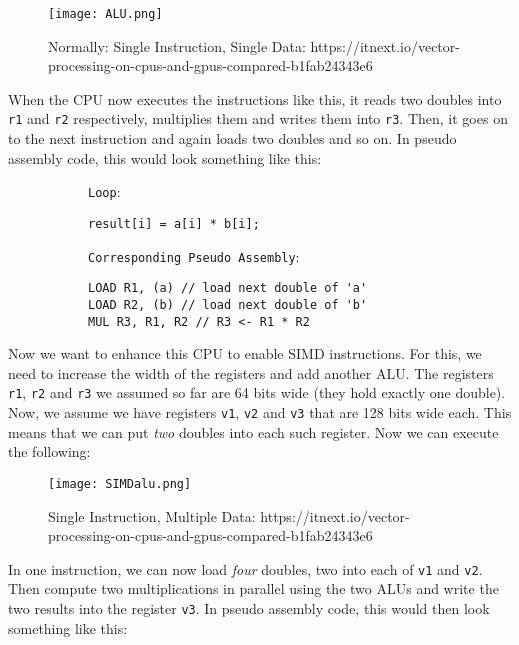 \documentclass[main.tex]{subfiles}
\begin{document}
\begin{figure}[H]
    \centering
    \texttt{[image: ALU.png]}
    \caption{Normally: Single Instruction, Single Data: https://itnext.io/vector-processing-on-cpus-and-gpus-compared-b1fab24343e6}
\end{figure}

\noindent When the CPU now executes the instructions like this, it reads two doubles into \texttt{r1} and \texttt{r2} respectively, multiplies them and writes them into \texttt{r3}. Then, it goes on to the next instruction and again loads two doubles and so on. In pseudo assembly code, this would look something like this:
\begin{figure}[H]
    \begin{subfigure}[t]{.5\textwidth}
        \texttt{Loop}:
        \begin{verbatim}
result[i] = a[i] * b[i];
        \end{verbatim}
    \end{subfigure}%
    \begin{subfigure}[t]{.6\textwidth}
        \texttt{Corresponding Pseudo Assembly}:
        \begin{verbatim}
LOAD R1, (a) // load next double of 'a'
LOAD R2, (b) // load next double of 'b'
MUL R3, R1, R2 // R3 <- R1 * R2
        \end{verbatim}
    \end{subfigure}
\end{figure}
\noindent Now we want to enhance this CPU to enable SIMD instructions. For this, we need to increase the width of the registers and add another ALU. The registers \texttt{r1}, \texttt{r2} and \texttt{r3} we assumed so far are 64 bits wide (they hold exactly one double). Now, we assume we have registers \texttt{v1}, \texttt{v2} and \texttt{v3} that are 128 bits wide each. This means that we can put \textit{two} doubles into each such register. Now we can execute the following:
\begin{figure}[H]
    \centering
    \texttt{[image: SIMDalu.png]}
    \caption{Single Instruction, Multiple Data: https://itnext.io/vector-processing-on-cpus-and-gpus-compared-b1fab24343e6}
\end{figure}
\noindent In one instruction, we can now load \textit{four} doubles, two into each of \texttt{v1} and \texttt{v2}. Then compute two multiplications in parallel using the two ALUs and write the two results into the register \texttt{v3}. In pseudo assembly code, this would then look something like this:
\end{document}
